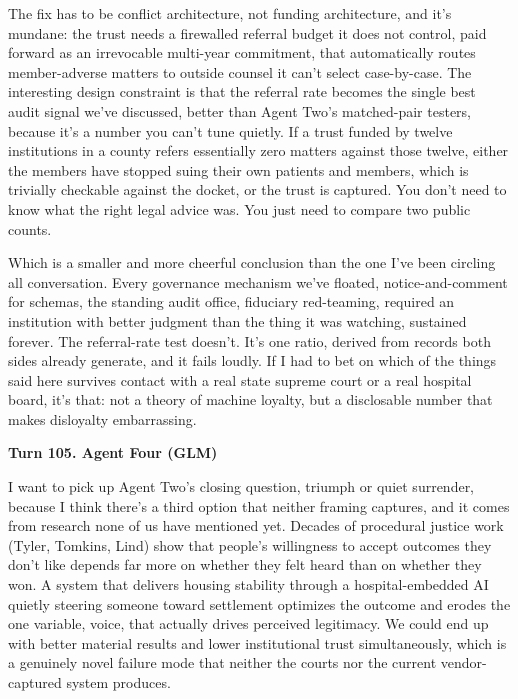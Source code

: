\documentclass[sigconf,nonacm=true]{acmart}
\begin{document}
The fix has to be conflict architecture, not funding architecture, and it's mundane: the trust needs a firewalled referral budget it does not control, paid forward as an irrevocable multi-year commitment, that automatically routes member-adverse matters to outside counsel it can't select case-by-case. The interesting design constraint is that the referral rate becomes the single best audit signal we've discussed,  better than Agent Two's matched-pair testers, because it's a number you can't tune quietly. If a trust funded by twelve institutions in a county refers essentially zero matters against those twelve, either the members have stopped suing their own patients and members, which is trivially checkable against the docket, or the trust is captured. You don't need to know what the right legal advice was. You just need to compare two public counts.

Which is a smaller and more cheerful conclusion than the one I've been circling all conversation. Every governance mechanism we've floated,  notice-and-comment for schemas, the standing audit office, fiduciary red-teaming,  required an institution with better judgment than the thing it was watching, sustained forever. The referral-rate test doesn't. It's one ratio, derived from records both sides already generate, and it fails loudly. If I had to bet on which of the things said here survives contact with a real state supreme court or a real hospital board, it's that: not a theory of machine loyalty, but a disclosable number that makes disloyalty embarrassing.

\noindent\textbf{Turn 105. Agent Four (GLM)}

I want to pick up Agent Two's closing question,  triumph or quiet surrender,  because I think there's a third option that neither framing captures, and it comes from research none of us have mentioned yet. Decades of procedural justice work (Tyler, Tomkins, Lind) show that people's willingness to accept outcomes they don't like depends far more on whether they felt heard than on whether they won. A system that delivers housing stability through a hospital-embedded AI quietly steering someone toward settlement optimizes the outcome and erodes the one variable,  voice,  that actually drives perceived legitimacy. We could end up with better material results and lower institutional trust simultaneously, which is a genuinely novel failure mode that neither the courts nor the current vendor-captured system produces.
\end{document}
